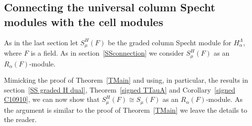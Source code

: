 \documentclass[twoside,11pt,reqno]{amsart}
\numberwithin{equation}{section}
\theoremstyle{definition}  %
\newcommand{\0}{{\bar 0}}
\newcommand{\1}{{\bar 1}}
\newcommand{\La}{\Lambda}
\newcommand{\al}{\alpha}
\newcommand\Par[1][]{{\mathscr P}^{\kappa#1}}
\begin{document}
\subsection{Connecting the universal column Specht modules with the cell modules}
As in the last section let $S_\mu^H(F)$ be the graded column Specht module for
$H_\al^\La$, where $F$ is a field. As in section~\ref{SSconnection} we consider $S_\mu^H(F)$ as an
$R_\al(F)$-module. 

Mimicking the proof of Theorem~\ref{TMain} and using, in particular, the results in 
section~\ref{SS graded H dual}, Theorem~\ref{signed TTauA} and Corollary~\ref{signed C10910}, we can now show that
$S_\mu^H(F)\cong S_\mu(F)$ as an $R_\al(F)$-module. As the argument is similar to the proof of Theorem~\ref{TMain} we
leave the details to the reader.
\end{document}

